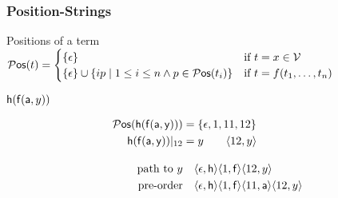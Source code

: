 
\begin{frame}
\frametitle{Position-Strings}
\begin{exampleblock}{Positions of a term}
$
	{}{\mathcal P}\mathsf{os}(t) =  
	\begin{cases}
		\{ \epsilon \} & \text{if }t=x\in{\mathcal V} \\
		\{ \epsilon \} \cup \{ ip\mid 1\leq i\leq n \land p\in{}{\mathcal P}\mathsf{os}(t_i)\} &
		\text{if }t=f(t_1,\ldots,t_n)
	\end{cases}
$
\end{exampleblock}

%

\begin{exampleblock}{${\mathsf h}({\mathsf f}({\mathsf a},y))$}
\begin{minipage}[c]{3cm}
\end{minipage}
%
\begin{minipage}[c]{8cm}
\begin{align*}
\Pos(\mh(\mf(\ma,\my))) &= \{ \epsilon, 1, 11, 12 \}
\\
\mh(\mf(\ma,\my))|_{12} &= y \tag*{$\ANGLES{12,y}$}
\\[1em]
\text{path to }y &\quad 
\ANGLES{\epsilon,\mh}\ANGLES{1,\mf}\ANGLES{12,y}
\\
\text{pre-order} &\quad
\ANGLES{\epsilon,\mh}\ANGLES{1,\mf}\ANGLES{11,\ma}\ANGLES{12,y}
\\
\end{align*}
%
\end{minipage}
\end{exampleblock}
\end{frame}
